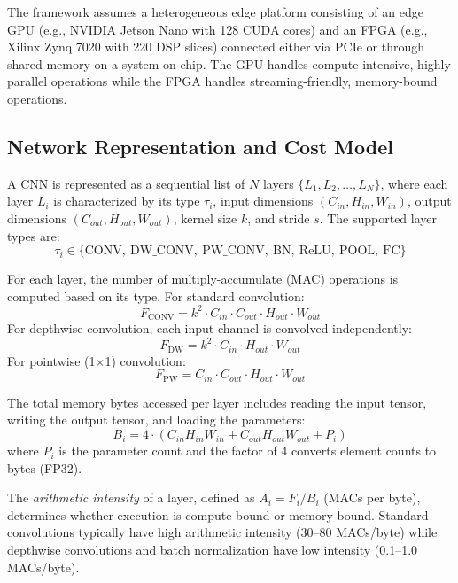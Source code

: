 \documentclass[runningheads]{llncs}
\begin{document}
The framework assumes a heterogeneous edge platform consisting of an edge GPU (e.g., NVIDIA Jetson Nano with 128 CUDA cores) and an FPGA (e.g., Xilinx Zynq 7020 with 220 DSP slices) connected either via PCIe or through shared memory on a system-on-chip. The GPU handles compute-intensive, highly parallel operations while the FPGA handles streaming-friendly, memory-bound operations.

\subsection{Network Representation and Cost Model}\label{sec:cost_model}

A CNN is represented as a sequential list of $N$ layers $\{L_1, L_2, \ldots, L_N\}$, where each layer $L_i$ is characterized by its type $\tau_i$, input dimensions $(C_{in}, H_{in}, W_{in})$, output dimensions $(C_{out}, H_{out}, W_{out})$, kernel size $k$, and stride $s$. The supported layer types are:
\begin{equation}
    \tau_i \in \{\text{CONV},\ \text{DW\_CONV},\ \text{PW\_CONV},\ \text{BN},\ \text{ReLU},\ \text{POOL},\ \text{FC}\}
\end{equation}

For each layer, the number of multiply-accumulate (MAC) operations is computed based on its type. For standard convolution:
\begin{equation}
    F_{\text{CONV}} = k^2 \cdot C_{in} \cdot C_{out} \cdot H_{out} \cdot W_{out}
\end{equation}
For depthwise convolution, each input channel is convolved independently:
\begin{equation}
    F_{\text{DW}} = k^2 \cdot C_{in} \cdot H_{out} \cdot W_{out}
\end{equation}
For pointwise (1$\times$1) convolution:
\begin{equation}
    F_{\text{PW}} = C_{in} \cdot C_{out} \cdot H_{out} \cdot W_{out}
\end{equation}

The total memory bytes accessed per layer includes reading the input tensor, writing the output tensor, and loading the parameters:
\begin{equation}
    B_i = 4 \cdot (C_{in} H_{in} W_{in} + C_{out} H_{out} W_{out} + P_i)
\end{equation}
where $P_i$ is the parameter count and the factor of 4 converts element counts to bytes (FP32).

The \textit{arithmetic intensity} of a layer, defined as $A_i = F_i / B_i$ (MACs per byte), determines whether execution is compute-bound or memory-bound. Standard convolutions typically have high arithmetic intensity (30--80 MACs/byte) while depthwise convolutions and batch normalization have low intensity (0.1--1.0 MACs/byte).
\end{document}
